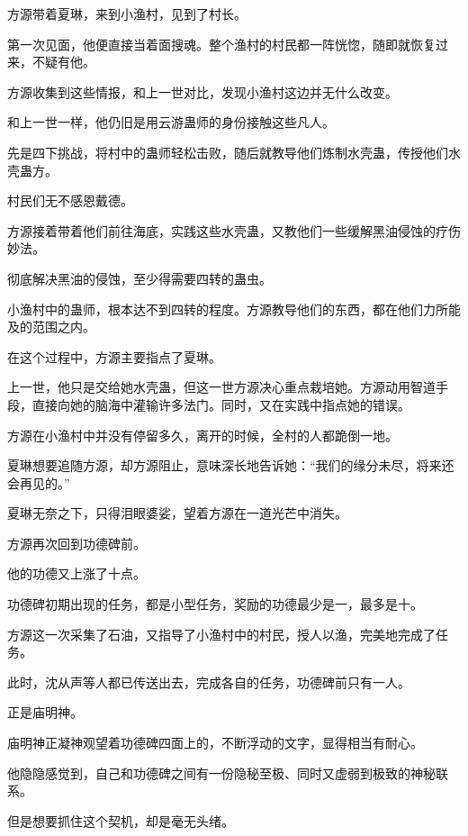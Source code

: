 
\begin{this_body}



方源带着夏琳，来到小渔村，见到了村长。

第一次见面，他便直接当着面搜魂。整个渔村的村民都一阵恍惚，随即就恢复过来，不疑有他。

方源收集到这些情报，和上一世对比，发现小渔村这边并无什么改变。

和上一世一样，他仍旧是用云游蛊师的身份接触这些凡人。

先是四下挑战，将村中的蛊师轻松击败，随后就教导他们炼制水壳蛊，传授他们水壳蛊方。

村民们无不感恩戴德。

方源接着带着他们前往海底，实践这些水壳蛊，又教他们一些缓解黑油侵蚀的疗伤妙法。

彻底解决黑油的侵蚀，至少得需要四转的蛊虫。

小渔村中的蛊师，根本达不到四转的程度。方源教导他们的东西，都在他们力所能及的范围之内。

在这个过程中，方源主要指点了夏琳。

上一世，他只是交给她水壳蛊，但这一世方源决心重点栽培她。方源动用智道手段，直接向她的脑海中灌输许多法门。同时，又在实践中指点她的错误。

方源在小渔村中并没有停留多久，离开的时候，全村的人都跪倒一地。

夏琳想要追随方源，却方源阻止，意味深长地告诉她：“我们的缘分未尽，将来还会再见的。”

夏琳无奈之下，只得泪眼婆娑，望着方源在一道光芒中消失。

方源再次回到功德碑前。

他的功德又上涨了十点。

功德碑初期出现的任务，都是小型任务，奖励的功德最少是一，最多是十。

方源这一次采集了石油，又指导了小渔村中的村民，授人以渔，完美地完成了任务。

此时，沈从声等人都已传送出去，完成各自的任务，功德碑前只有一人。

正是庙明神。

庙明神正凝神观望着功德碑四面上的，不断浮动的文字，显得相当有耐心。

他隐隐感觉到，自己和功德碑之间有一份隐秘至极、同时又虚弱到极致的神秘联系。

但是想要抓住这个契机，却是毫无头绪。


\end{this_body}
